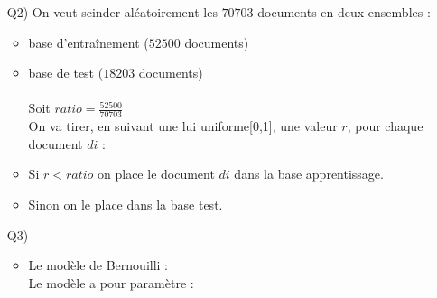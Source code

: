 \documentclass[a4paper, 12pt]{article}
\begin{document}
\begin{enumerate}
\item[Q2)] 
On veut scinder aléatoirement les $70703$ documents en deux ensembles :
\begin{itemize}
\item base d'entraînement ($52500$ documents) 
\item base de test ($18203$ documents)
\\
\\
Soit $ratio = \frac{52500}{70703}$ \\
On va tirer, en suivant une lui uniforme[0,1], une valeur $r$, pour chaque document $di$ :
\item Si $r<ratio$ on place le document $di$ dans la base apprentissage.
\item Sinon on le place dans la base test.
\end{itemize}

\item[Q3)]
\begin{itemize}
\item Le modèle de Bernouilli : \\
Le modèle a pour paramètre :\\
 
\end{itemize}

\end{enumerate}
\end{document}
